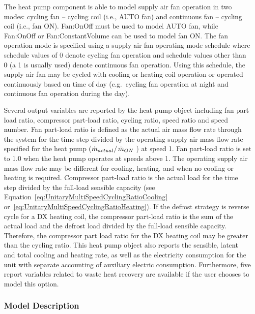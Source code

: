The heat pump component is able to model supply air fan operation in two modes: cycling fan -- cycling coil (i.e., AUTO fan) and continuous fan -- cycling coil (i.e., fan ON). Fan:OnOff must be used to model AUTO fan, while Fan:OnOff or Fan:ConstantVolume can be used to model fan ON. The fan operation mode is specified using a supply air fan operating mode schedule where schedule values of 0 denote cycling fan operation and schedule values other than 0 (a 1 is usually used) denote continuous fan operation. Using this schedule, the supply air fan may be cycled with cooling or heating coil operation or operated continuously based on time of day (e.g.~cycling fan operation at night and continuous fan operation during the day).

Several output variables are reported by the heat pump object including fan part-load ratio, compressor part-load ratio, cycling ratio, speed ratio and speed number. Fan part-load ratio is defined as the actual air mass flow rate through the system for the time step divided by the operating supply air mass flow rate specified for the heat pump (\({{{{\dot m}_{actual}}} \mathord{\left/ {\vphantom {{{{\dot m}_{actual}}} {{{\dot m}_{design}}}}} \right. } {{{\dot m}_{ON}}}}\) ) at speed 1. Fan part-load ratio is set to 1.0 when the heat pump operates at speeds above 1. The operating supply air mass flow rate may be different for cooling, heating, and when no cooling or heating is required. Compressor part-load ratio is the actual load for the time step divided by the full-load sensible capacity (see Equation~\ref{eq:UnitaryMultiSpeedCyclingRatioCooling} or~\ref{eq:UnitaryMultiSpeedCyclingRatioHeating}). If the defrost strategy is reverse cycle for a DX heating coil, the compressor part-load ratio is the sum of the actual load and the defrost load divided by the full-load sensible capacity. Therefore, the compressor part load ratio for the DX heating coil may be greater than the cycling ratio. This heat pump object also reports the sensible, latent and total cooling and heating rate, as well as the electricity consumption for the unit with separate accounting of auxiliary electric consumption. Furthermore, five report variables related to waste heat recovery are available if the user chooses to model this option.

\subsubsection{Model Description}\label{model-description-4}

